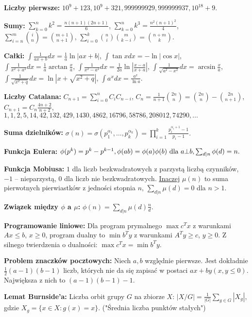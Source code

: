 \noindent
\textbf{Liczby pierwsze:} $10^9 + 123, 10^9 + 321, 999999929, 999999937, 10^{18} + 9.$

\noindent
\textbf{Sumy:} $\sum_{k = 0}^n k^2 = \frac{n(n+1)(2n+1)}{6}$, $\sum_{k = 0}^n k^3 = \frac{n^2(n+1)^2}{4}$, $\sum_{i = n}^m \binom{i}{n} = \binom{m + 1}{n + 1}$, $\sum_{i = 0}^k \binom{n}{i} \binom{m}{k - i} = \binom{n + m}{k}.$

\noindent
\textbf{Całki:} $\int \frac{1}{ax + b}dx = \frac{1}{a}\ln |ax + b|$, $\int{\tan{x} dx} = -\ln|\cos{x}|$, $\int \frac{1}{x^2 + a^2}dx = \frac{1}{a}\arctan{\frac{x}{a}}$, $\int \frac{1}{x^2 - a^2}dx = \frac{1}{2a}\ln{|\frac{x - a}{x + a}|}$, $\int \frac{1}{\sqrt{a^2 - x^2}}dx = \arcsin{\frac{x}{a}}$, $\int \frac{1}{\sqrt{x^2 + q}}dx = \ln{|x + \sqrt{x^2 + q}|}$, $\int a^xdx = \frac{a^x}{\ln a}.$

\noindent
\textbf{Liczby Catalana:} $C_{n+1} = \sum_{i=0}^nC_iC_{n-i}$, $C_n = \frac{1}{n+1}\binom{2n}{n} = \binom{2n}{n} - \binom{2n}{n+1}$, $C_{n+1} = C_n \frac{4n+2}{n+2}$, $1, 1, 2, 5, 14, 42, 132, 429, 1430, 4862, 16796, 58786, 208012, 74290, \dots$

\noindent
\textbf{Suma dzielników:} $\sigma(n) = \sigma(p_1^{\alpha_1}, \dots, p_k^{\alpha_k}) = \prod_{i = 1}^k \frac{p_i ^ {\alpha_i + 1} - 1}{p_i - 1}.$

\noindent
\textbf{Funkcja Eulera:} $\phi(p^k) = p^k - p^{k-1}, \phi(ab) = \phi(a)\phi(b) \hbox{ dla } a \bot b, \sum_{d|n}\phi(d)=n.$

\noindent
\textbf{Funkcja Mobiusa:} $1$ dla liczb bezkwadratowych z parzystą liczbą czynników, $-1$ -- nieparzystą, $0$ dla liczb nie bezkwadratowych. \underline{Inaczej} $\mu(n)$ to suma pierwotnych pierwiastków z jedności stopnia $n$, $\sum_{d|n}\mu(d) = 0$ dla $n>1$.

\noindent
\textbf{Związek między $\phi$ a $\mu$:} $\phi(n) = \sum_{d|n} \mu(d) \frac{n}{d}.$

\noindent
\textbf{Programowanie liniowe:} Dla program prymalnego $\max c^{T}x$ z warunkami $Ax \leq b$, $x \geq 0$, program dualny to $\min b^{T}y$ z warunkami
$A^{T}y \geq c$, $y \geq 0$. Z silnego twierdzenia o dualności: $\max c^{T}x = \min b^{T}y$.

\noindent
\textbf{Problem znaczków pocztowych:}  Niech $a, b$ względnie pierwsze. Jest dokładnie $\frac{1}{2} (a-1)(b-1)$ liczb,
których nie da się zapisać w postaci $ax+by(x,y \le 0)$. Największa z nich to $(a - 1)(b - 1) - 1$.

\noindent
\textbf{Lemat Burnside’a:} Liczba orbit grupy $G$ na zbiorze $X$: $|X/G| = \frac{1}{|G|} \sum_{g \in G} |X_g|$, gdzie $X_g = \{x \in X : g(x) = x\}$. ("Średnia liczba punktów stałych")

